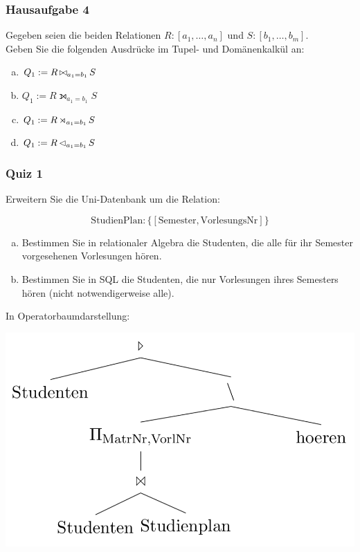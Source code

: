 \begin{frame}
	\frametitle{Hausaufgabe 4}
	\vspace{0.5cm}

	Gegeben seien die beiden Relationen \( R: {[a_1, \hdots, a_n]} \) und \( S: {[b_1, \hdots, b_m]} \). \\
	Geben Sie die folgenden Ausdrücke im Tupel- und Domänenkalkül an:
	\begin{enumerate}[a)]
		\item \( Q_1 := R \operatorname*{\bowtie}_{a_1 = b_1} S \)
		\item \( Q_1 := R \leftouterjoin_{a_1 = b_1} S \)
		\item \( Q_1 := R \operatorname*{\rtimes}_{a_1 = b_1} S \)
		\item \( Q_1 := R \operatorname*{\lhd}_{a_1 = b_1} S \)
	\end{enumerate}
\end{frame}

\begin{frame}[fragile]
	\frametitle{Quiz 1}
	\vspace{0.5cm}

	\begin{multicols}{2}
		Erweitern Sie die Uni-Datenbank um die Relation:

		\[ \text{StudienPlan}: \{ [\text{Semester}, \text{VorlesungsNr}] \} \]

		\begin{enumerate}[a)]
			\item<1-> Bestimmen Sie in relationaler Algebra die Studenten, die alle für ihr Semester
				vorgesehenen Vorlesungen hören.
			\item<2-> Bestimmen Sie in SQL die Studenten,
				die nur Vorlesungen ihres Semesters hören (nicht notwendigerweise alle).
		\end{enumerate}
		\vfill\columnbreak
		\pause

		In Operatorbaumdarstellung:
		\begin{center}
			\includegraphics[height=.3\paperheight]{./quiz1.png}
		\end{center}
	\end{multicols}

\end{frame}

